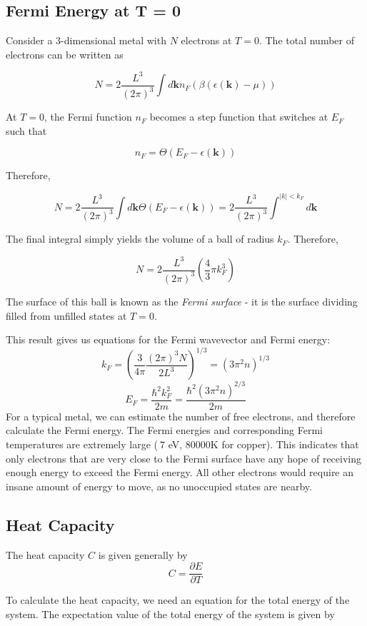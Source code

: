 \documentclass[10pt]{article}
\begin{document}
\subsection{Fermi Energy at T = 0}
Consider a 3-dimensional metal with $N$ electrons at $T = 0$. The total number of electrons can be written as

$$
N = 2 \frac{L^{3}}{(2\pi)^{3}}\int d\textbf{k} n_{F}(\beta(\epsilon(\textbf{k}) - \mu))
$$

At $T = 0$, the Fermi function $n_{F}$ becomes a step function that switches at $E_{F}$ such that

$$n_{F} = \Theta(E_{F} - \epsilon(\textbf{k}))$$

Therefore,

$$
N = 2 \frac{L^{3}}{(2\pi)^{3}}\int d\textbf{k} \Theta(E_{F} - \epsilon(\textbf{k})) = 2 \frac{L^{3}}{(2\pi)^{3}} \int^{|k|<k_{F}}d\textbf{k}
$$

The final integral simply yields the volume of a ball of radius $k_{F}$. Therefore,

$$N = 2 \frac{L^{3}}{(2\pi)^{3}} \left (\frac{4}{3}\pi k_{F}^3\right )$$

The surface of this ball is known as the \emph{Fermi surface} - it is the surface dividing filled from unfilled states at $T = 0$.

This result gives us equations for the Fermi wavevector and Fermi energy:
$$
k_{F} = \left ( \frac{3}{4\pi}\frac{(2\pi)^{3} N}{2L^{3}}\right )^{1/3} = (3\pi^{2}n)^{1/3}
$$
$$
E_{F} = \frac{\hbar^{2}k_{F}^{2}}{2m} = \frac{\hbar^{2}(3\pi^{2}n)^{2/3}}{2m}
$$
For a typical metal, we can estimate the number of free electrons, and therefore calculate the Fermi energy. The Fermi energies and corresponding
Fermi temperatures are extremely large ($~7$ eV, $80000$K for copper). This indicates that only electrons that are very close to the Fermi surface
have any hope of receiving enough energy to exceed the Fermi energy. All other electrons would require an insane amount of energy to move, as no unoccupied states are nearby.


\subsection{Heat Capacity}
The heat capacity $C$ is given generally by
$$C = \frac{\partial E}{\partial T}$$

To calculate the heat capacity, we need an equation for the total energy of the system. The expectation value
of the total energy of the system is given by
\end{document}
